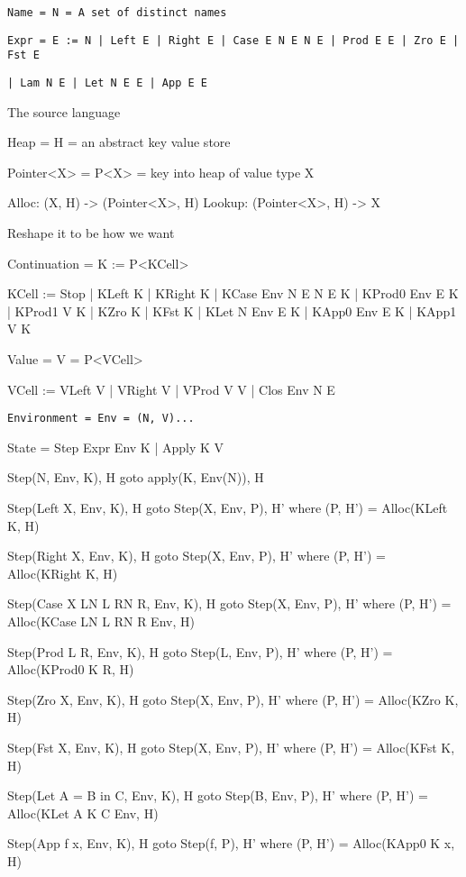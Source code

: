 \documentclass[acmsmall]{acmart}
\begin{document}
	\begin{mdframed}
	\texttt{Name = N = A set of distinct names}
		
	\texttt{Expr = E := N | Left E | Right E | Case E N E N E | Prod E E | Zro E | Fst E}

	\texttt{| Lam N E | Let N E E | App E E}

	The source language
	\end{mdframed}
	\begin{mdframed}
		Heap = H = an abstract key value store
		
		Pointer<X> = P<X> = key into heap of value type X
		
		Alloc: (X, H) -> (Pointer<X>, H)
		Lookup: (Pointer<X>, H) -> X
		
		Reshape it to be how we want
		
		Continuation = K := P<KCell>
		
		KCell := Stop | KLeft K | KRight K | KCase Env N E N E K | KProd0 Env E K | KProd1 V K | KZro K | KFst K | KLet N Env E K | KApp0 Env E K | KApp1 V K
	
		Value = V = P<VCell>
		
		VCell := VLeft V | VRight V | VProd V V | Clos Env N E
	
		\texttt{Environment = Env = (N, V)...}
				
		State = Step Expr Env K | Apply K V

		Step(N, Env, K), H goto apply(K, Env(N)), H

		Step(Left X, Env, K), H goto Step(X, Env, P), H' where (P, H') = Alloc(KLeft K, H)
		
		Step(Right X, Env, K), H goto Step(X, Env, P), H' where (P, H') = Alloc(KRight K, H)
		
		Step(Case X LN L RN R, Env, K), H goto Step(X, Env, P), H' where (P, H') = Alloc(KCase LN L RN R Env, H)
		
		Step(Prod L R, Env, K), H goto Step(L, Env, P), H' where (P, H') = Alloc(KProd0 K R, H)
		
		Step(Zro X, Env, K), H goto Step(X, Env, P), H' where (P, H') = Alloc(KZro K, H)
		
		Step(Fst X, Env, K), H goto Step(X, Env, P), H' where (P, H') = Alloc(KFst K, H)
		
		Step(Let A = B in C, Env, K), H goto Step(B, Env, P), H' where (P, H') = Alloc(KLet A K C Env, H)
		
		Step(App f x, Env, K), H goto Step(f, P), H' where (P, H') = Alloc(KApp0 K x, H)
		

\end{mdframed}
\end{document}
